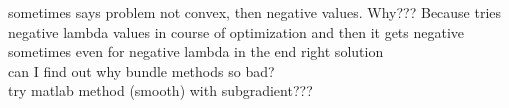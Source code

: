 sometimes says problem not convex, then negative values. Why??? Because tries negative lambda values in course of optimization and then it gets negative \\
sometimes even for negative lambda in the end right solution \\
can I find out why bundle methods so bad? \\
try matlab method (smooth) with subgradient???




%
%
%
%
%
%

